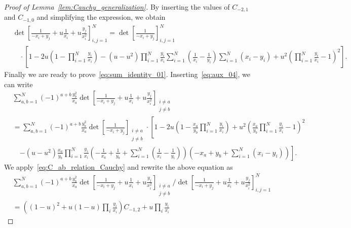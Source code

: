 \documentclass{article}
\numberwithin{equation}{section}
\begin{document}
\begin{proof}[Proof of Lemma~\ref{lem:Cauchy_generalization}]
By inserting the values of $C_{-2,1}$ and $C_{-1,0}$ and simplifying the expression, we obtain
\begin{equation}
	\label{eq:aux_04}
	\begin{split}
		&\det\left[  \frac{1}{-x_i+y_j} +u \frac{1}{x_i} +u \frac{y_j}{x_i^2} \right]_{i,j=1}^N =  \det\left[\frac{1}{-x_i+y_j}\right]_{i,j=1}^N\\
		&\quad \cdot \left[
		1 - 2u\left( 1-\prod_{i=1}^N \frac{y_i}{x_i}\right) -(u-u^2)\prod_{i=1}^N \frac{y_i}{x_i}\sum_{i=1}^N\left(\frac{1}{x_i}-\frac{1}{y_i}\right)\sum_{i=1}^N (x_i-y_i) + u^2 \left(\prod_{i=1}^N \frac{y_i}{x_i}-1\right)^2
		\right].
	\end{split}
\end{equation}
Finally we are ready to prove~\eqref{eq:sum_identity_01}. Inserting~\eqref{eq:aux_04}, we can write
\begin{equation*}
	\begin{split}
		&\sum_{a,b=1}^N (-1)^{a+b} \frac{y_b^2}{x_a} 
		\det\left[  \frac{1}{-x_i+y_j} +u \frac{1}{x_i} +u \frac{y_j}{x_i^2} \right]_{\substack{i\ne a\\ j\ne b}}\\
		&=\sum_{a,b=1}^N (-1)^{a+b} \frac{y_b^2}{x_a} \det\left[\frac{1}{-x_i+y_j}\right]_{\substack{i\ne a\\ j\ne b}}
		\cdot \left[
		1 - 2u\left( 1-\frac{x_a}{y_b}\prod_{i=1}^N \frac{y_i}{x_i}\right)
		 + u^2 \left(\frac{x_a}{y_b}\prod_{i=1}^N \frac{y_i}{x_i}-1\right)^2\right.\\
		&\quad\left. -(u-u^2)\frac{x_a}{y_b}\prod_{i=1}^N \frac{y_i}{x_i}
		\left(-\frac{1}{x_a}+\frac{1}{y_b}+
		\sum_{i=1}^N\left(\frac{1}{x_i}-\frac{1}{y_i}\right)\right)
		\left(-x_a+y_b+ \sum_{i=1}^N (x_i-y_i)\right)
		\right].
	\end{split}
\end{equation*}
We apply~\eqref{eq:C_ab_relation_Cauchy} and rewrite the above equation as
\begin{equation}
	\begin{split}
		&\sum_{a,b=1}^N 
		    (-1)^{a+b} \frac{y_b^2}{x_a} 
		        \det\left[
		               \frac{1}{-x_i+y_j} +u \frac{1}{x_i} +u \frac{y_j}{x_i^2} 
		            \right]_{\substack{i\ne a\\ j\ne b}}
		       /\det\left[
		              \frac{1}{-x_i+y_j} +u \frac{1}{x_i} +u \frac{y_j}{x_i^2} 
		            \right]_{i,j=1}^N\\
	  &=\left(
	         (1-u)^2 +u(1-u)\prod_i\frac{y_i}{x_i}
	    \right)C_{-1,2}
	    +u\prod_i\frac{y_i}{x_i}

\end{split}
\end{equation}
\end{proof}
\end{document}
